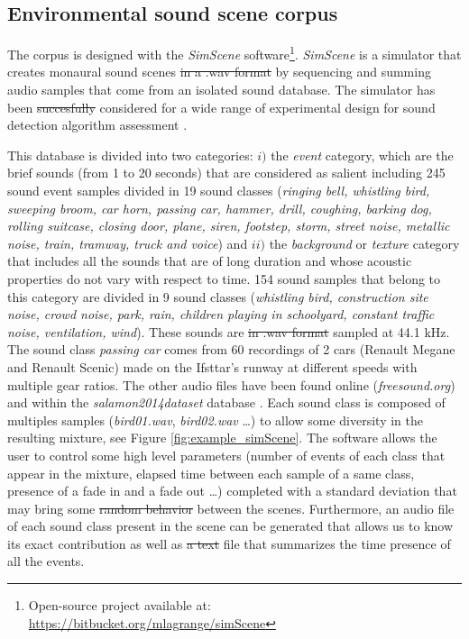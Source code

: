 \documentclass[twocolumn]{svjour3}          %
\providecommand{\DIFaddtex}[1]{{\protect\color{blue}\uwave{#1}}} %
\providecommand{\DIFdeltex}[1]{{\protect\color{red}\sout{#1}}}                      %
\providecommand{\DIFaddbegin}{} %
\providecommand{\DIFaddend}{} %
\providecommand{\DIFdelbegin}{} %
\providecommand{\DIFdelend}{} %
\providecommand{\DIFadd}[1]{\texorpdfstring{\DIFaddtex{#1}}{#1}} %
\providecommand{\DIFdel}[1]{\texorpdfstring{\DIFdeltex{#1}}{}} %
\begin{document}
\subsection{Environmental sound scene corpus}

The corpus is designed with the \textit{SimScene} software\footnote{Open-source project available at: \url{https://bitbucket.org/mlagrange/simScene}}. \textit{SimScene} \cite{rossignol_simscene:_2015} is a simulator that creates monaural sound scenes \DIFdelbegin \DIFdel{in a .wav format }\DIFdelend by sequencing and summing audio samples that come from an isolated sound database. The simulator has been \DIFdelbegin \DIFdel{succesfully }\DIFdelend \DIFaddbegin \DIFadd{successfully }\DIFaddend considered for a wide range of experimental design for sound detection algorithm assessment \cite{lafay:hal-01111381} \cite{benetos:hal-01520194} \cite{mesaros:hal-01650601}.

This database is divided into two categories: $i)$ the \textit{event} category, which are the brief sounds (from 1 to 20 seconds) that are considered as salient including 245 sound event samples divided in 19 sound classes (\textit{ringing bell, whistling bird, sweeping broom, car horn, passing car, hammer, drill, coughing, barking dog, rolling suitcase, closing door, plane, siren, footstep, storm, street noise, metallic noise, train, tramway, truck and voice}) and $ii)$ the \textit{background} or \textit{texture} category that includes all the sounds that are of long duration and whose acoustic properties do not vary with respect to time. 154 sound samples that belong to this category are divided in 9 sound classes (\textit{whistling bird, construction site noise, crowd noise, park, rain, children playing in schoolyard, constant traffic noise, ventilation, wind}). These sounds are \DIFdelbegin \DIFdel{in .wav format }\DIFdelend sampled at 44.1 kHz. The sound class \textit{passing car} comes from 60 recordings of 2 cars (Renault Megane and Renault Scenic) made on the Ifsttar's runway at different speeds with multiple gear ratios. The other audio files have been found online (\textit{freesound.org}) and within the \textit{salamon2014dataset} database \cite{salamon_dataset_nodate}. Each sound class is composed of multiples samples (\textit{bird01.wav}, \textit{bird02.wav} \dots) to allow some diversity in the resulting mixture, see Figure \ref{fig:example_simScene}. The software allows the user to control some high level parameters (number of events of each class that appear in the mixture, elapsed time between each sample of a same class, presence of a fade in and a fade out \dots) completed with a standard deviation that may bring some \DIFdelbegin \DIFdel{random behavior }\DIFdelend \DIFaddbegin \DIFadd{compositional diversity }\DIFaddend between the scenes. Furthermore, an audio file of each sound class present in the scene can be generated that allows us to know its exact contribution as well as \DIFdelbegin \DIFdel{a text }\DIFdelend \DIFaddbegin \DIFadd{an annotation }\DIFaddend file that summarizes the time presence of all the events.\\
\end{document}
